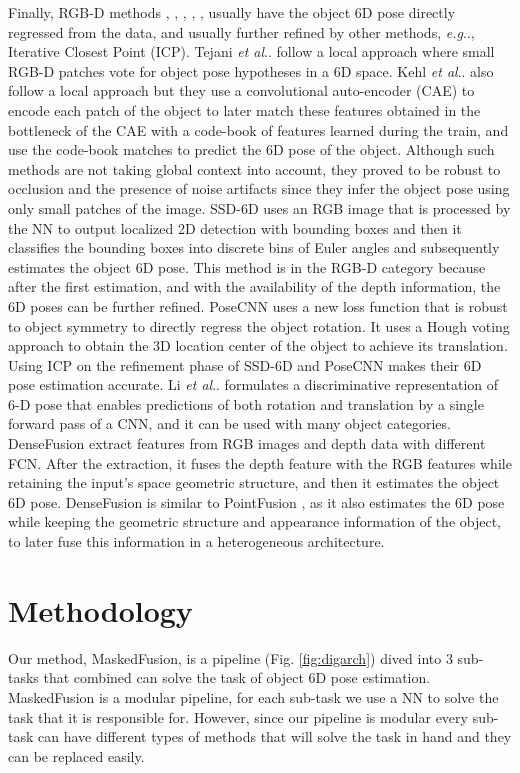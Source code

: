 \documentclass[runningheads]{llncs}
\makeatletter
\DeclareRobustCommand\onedot{\futurelet\@let@token\@onedot}
\def\@onedot{\ifx\@let@token.\else.\null\fi\xspace}
\def\eg{\emph{e.g}\onedot} \def\Eg{\emph{E.g}\onedot}
\def\etal{\emph{et al}\onedot}
\makeatother
\begin{document}
Finally, RGB-D methods \cite{ssd6d}, \cite{localrgbd}, \cite{liunified}, \cite{densefusion}, \cite{posecnn}, \cite{pointfusion} usually have the object 6D pose directly regressed from the data, and usually further refined by other methods, \eg, Iterative Closest Point (ICP).
Tejani \etal \cite{tejani} follow a local approach where small RGB-D patches vote for object pose hypotheses in a 6D space.
Kehl \etal \cite{localrgbd} also follow a local approach but they use a convolutional auto-encoder (CAE) to encode each patch of the object to later match these features obtained in the bottleneck of the CAE with a code-book of features learned during the train, and use the code-book matches to predict the 6D pose of the object.
Although such methods are not taking global context into account, they proved to be robust to occlusion and the presence of noise artifacts since they infer the object pose using only small patches of the image.
SSD-6D \cite{ssd6d} uses an RGB image that is processed by the NN to output localized 2D detection with bounding boxes and then it classifies the bounding boxes into discrete bins of Euler angles and subsequently estimates the object 6D pose.
This method is in the RGB-D category because after the first estimation, and with the availability of the depth information, the 6D poses can be further refined.
PoseCNN \cite{posecnn} uses a new loss function that is robust to object symmetry to directly regress the object rotation.
It uses a Hough voting approach to obtain the 3D location center of the object to achieve its translation.
Using ICP on the refinement phase of SSD-6D and PoseCNN makes their 6D pose estimation accurate.
Li \etal \cite{liunified} formulates a discriminative representation of 6-D pose that enables predictions of both rotation and translation by a single forward pass of a CNN, and it can be used with many object categories.
DenseFusion \cite{densefusion} extract features from RGB images and depth data with different FCN.
After the extraction, it fuses the depth feature with the RGB features while retaining the input's space geometric structure, and then it estimates the object 6D pose. 
DenseFusion is similar to PointFusion \cite{pointfusion}, as it also estimates the 6D pose while keeping the geometric structure and appearance information of the object, to later fuse this information in a heterogeneous architecture.

\section{Methodology}
Our method, MaskedFusion, is a pipeline (Fig. \ref{fig:digarch}) dived into 3 sub-tasks that combined can solve the task of object 6D pose estimation.
MaskedFusion is a modular pipeline, for each sub-task we use a NN to solve the task that it is responsible for.
However, since our pipeline is modular every sub-task can have different types of methods that will solve the task in hand and they can be replaced easily.
\end{document}
